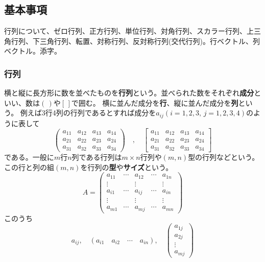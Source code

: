 \documentclass[10pt]{jsreport}
\theoremstyle{definition}%
\numberwithin{equation}{section}%
\begin{document}
\subsection{基本事項}
行列について、ゼロ行列、正方行列、単位行列、対角行列、スカラー行列、上三角行列、下三角行列、転置、対称行列、反対称行列(交代行列)。行ベクトル、列ベクトル。添字。
\subsubsection{行列}
横と縦に長方形に数を並べたものを{\bf 行列}という。並べられた数をそれぞれ{\bf 成分}といい、数は$(\,)$や$[\,]$で囲む。
横に並んだ成分を{\bf 行}、縦に並んだ成分を{\bf 列}という。
例えば3行4列の行列であるとすれば成分を$a_{ij}(i=1,2,3,\, j=1,2,3,4)$のように表して
\begin{equation}\left(
 \begin{matrix}
    a_{11} & a_{12} & a_{13} & a_{14} \\
    a_{21} & a_{22} & a_{23} & a_{24} \\
    a_{31} & a_{32} & a_{33} & a_{34} 
  \end{matrix}\right) \quad , \quad \left[
    \begin{matrix}
      a_{11} & a_{12} & a_{13} & a_{14} \\
      a_{21} & a_{22} & a_{23} & a_{24} \\
      a_{31} & a_{32} & a_{33} & a_{34} 
    \end{matrix}\right]
\end{equation}
である。一般に$m$行$n$列である行列は$m\times n$行列や$(m,n)$型の行列などという。この行と列の組$(m,n)$を行列の{\bf 型}や{\bf サイズ}という。
\begin{equation}
  \label{gyoretu}  A=
  \left(
 \begin{matrix}
    a_{11} & \cdots & a_{12} & \cdots & a_{1n} \\
    \vdots &        & \vdots &        & \vdots \\
    a_{i1} & \cdots & a_{ij} & \cdots & a_{in}\\ 
    \vdots &        & \vdots &        & \vdots \\
    a_{m1} & \cdots & a_{mj} & \cdots & a_{mn} 
  \end{matrix}\right)
\end{equation}
このうち 
\begin{equation}
  a_{ij} , \quad (a_{i1} \quad a_{i2} \quad \cdots \quad a_{in} ),\quad  \left( \begin{matrix}
    a_{1j}\\
    a_{2j}\\
    \vdots\\
    a_{mj}
  \end{matrix}\right)
\end{equation}
\end{document}
